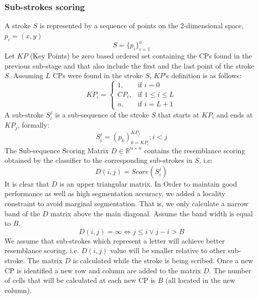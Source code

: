 \documentclass[journal,compsoc]{IEEEtran}
\begin{document}
\subsubsection{Sub-strokes scoring}
A stroke $S$ is represented by a sequence of points on the 2-dimensional space, $p_{i}=(x,y)$ 
\begin{equation}
S=\{p_{i}\}_{i=1}^{n}
\end{equation}
Let $KP$ (Key Points) be zero based ordered set containing the CPs found in the previous sub-stage and that also include the first and the last point of the stroke $S$. Assuming $L$ CPs were found in the stroke $S$, $KP$'s definition is as follows: 
\begin{equation}
KP_{i} =\begin{cases}    1		, & \mbox{if } i=0 \\
							   CP_{i}	, & \mbox{if } 1\leq i \leq L \\
							   n    , & \mbox{if } i=L+1 
			\end{cases}				
\end{equation}
A sub-stroke $S_{i}^{j}$ is a sub-sequence of the stroke $S$ that starts at $KP_{i}$ and ends at $KP_{j}$, formally:
\begin{equation}
S_{i}^{j}=(p_{k})_{k=KP_{i}}^{KP_{j}}; i<j
\end{equation}
The Sub-sequence Scoring Matrix $D\in\mathbb{R}^{n\times n}$ contains the resemblance scoring obtained by the classifier to the corresponding sub-strokes in $S$, i.e:
\begin{equation}
D(i,j)=Score(S_{i}^{j})
\end{equation}
It is clear that $D$ is an upper triangular matrix. In Order to maintain good performance as well as high segmentation accuracy, we added a locality constraint to avoid marginal segmentation. That is, we only calculate a narrow band of the $D$ matrix above the main diagonal. Assume the band width is equal to $B$.
\begin{equation}
D(i,j)=\infty \Leftrightarrow j \leq i \vee j-i>B 
\end{equation}
We assume that sub-strokes which represent a letter will achieve better resemblance scoring, i.e. $D(i,j)$ value will be smaller relative to other sub-stroke. The matrix $D$ is calculated while the stroke is being scribed. Once a new CP is identified a new row and column are added to the matrix $D$. 
The number of cells that will be calculated at each new CP is $B$ (all located in the new column).\\
\end{document}
